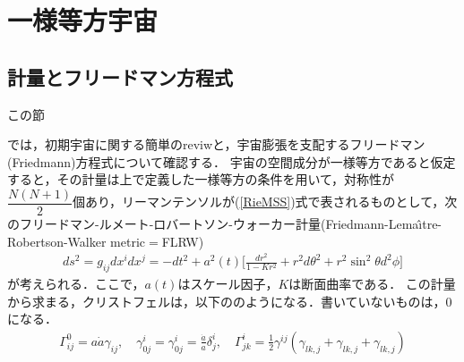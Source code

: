 \section{一様等方宇宙}
\subsection{計量とフリードマン方程式}
\hypertarget{ApA}{この節}では，初期宇宙に関する簡単のreviwと，宇宙膨張を支配するフリードマン(Friedmann)方程式について確認する．
宇宙の空間成分が一様等方であると仮定すると，その計量は上で定義した一様等方の条件を用いて，対称性が$\dfrac{N(N+1)}{2}$個あり，リーマンテンソルが(\ref{RieMSS})式で表されるものとして，次のフリードマン-ルメート-ロバートソン-ウォーカー計量(Friedmann-Lema\^{\i}tre-Robertson-Walker metric$=$FLRW)
\begin{eqnarray}
\label{FL}
ds^2=g_{ij}dx^idx^j=-dt^2+a^2(t)\biggl[\frac{dr^2}{1-Kr^2}+r^2d\theta^2+r^2\sin^2\theta d^2\phi\biggr]
\end{eqnarray}
が考えられる．ここで，$a(t)$はスケール因子，$K$は断面曲率である．
この計量から求まる，クリストフェルは，以下ののようになる．書いていないものは，$0$になる．
\begin{eqnarray}
\label{cccch}
\Gamma^{0}_{ij}=a\dot{a}\gamma_{ij},\quad \gamma^{i}_{0j}=\gamma^{i}_{0j}=\frac{\dot{a}}{a}\delta^{i}_{j},\quad　\Gamma^{i}_{jk}=\frac{1}{2}\gamma^{ij}(\gamma_{lk,j}+\gamma_{lk,j}+\gamma_{lk,j})
\end{eqnarray}

